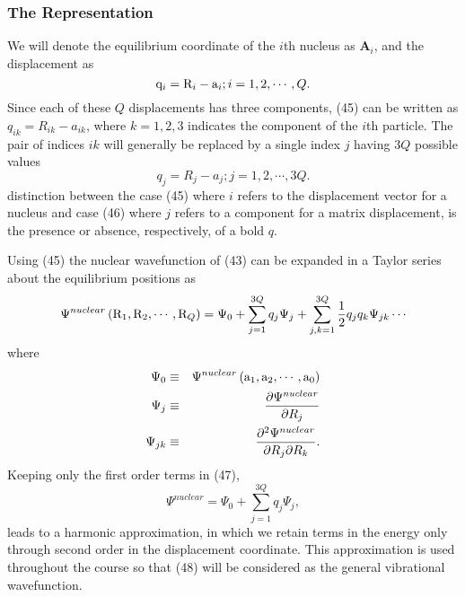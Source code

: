 \subsubsection{The Representation}

We will denote the equilibrium coordinate of the $i$th nucleus as {\bf 
A}$_i$, and the displacement as
\begin{equation}
{\bf{\rm q}}_i = {\bf{\rm R}}_i - {\bf{\rm a}}_i ; i = 1 , 2 , 
\cdots , Q.
\label{chap16-eqno45}
\end{equation}
Since each of these $Q$ displacements has three components, (45) can 
be written as $q_{ik} = R_{ik} - a_{ik}$, where $k = 1,2,3$ indicates 
the component of the $i$th particle.  The pair of indices $ik$ will 
generally be replaced by a single index $j$ having $3Q$ possible values
\begin{equation}
q_j = R_j - a_j ; j = 1 , 2, \cdots , 3Q.
\label{chap16-eqno46} 
\end{equation}
distinction between the case (45) where $i$ refers to the 
displacement vector for a nucleus and case (46) where $j$ refers to a 
component for a matrix displacement, is the presence or absence, 
respectively, of a bold $q$.

Using (45) the nuclear wavefunction of (43) can be expanded in a 
Taylor series about the equilibrium positions as
\begin{equation}
\Psi^{nuclear} \left( {\bf{\rm R}}_1 , {\bf{\rm R}}_2 , \cdots , {\bf{\rm 
R}}_Q \right) = \Psi_0 + \sum^{3Q}_{j=1} q_j \Psi_j + 
\sum^{3Q}_{j,k=1} {1 \over 2} q_j q_k \Psi_{jk} \cdots
\label{chap16-eqno47}
\end{equation}
where
\begin{eqnarray}
\Psi_0 & \equiv& \Psi^{nuclear} \left( {\bf{\rm a}}_1, {\bf{\rm a}}_2 , 
\cdots , {\bf{\rm a}}_0 \right)\cr
\Psi_j & \equiv& {\partial \Psi^{nuclear} \over \partial R_j}\cr
\Psi_{jk} & \equiv & {\partial^2 \Psi^{nuclear} \over \partial R_j 
\partial R_k}.
\end{eqnarray}
Keeping only the first order terms in (47),
\begin{equation}
\Psi^{nuclear} = \Psi_0 + \sum^{3Q}_{j=1} q_j \Psi_j,
\label{chap16-eqno48}
\end{equation}
leads to a harmonic approximation, in which we retain terms in the 
energy only through second order in the displacement coordinate.  
This approximation is used throughout the course so that (48) will be 
considered as the general vibrational wavefunction.

